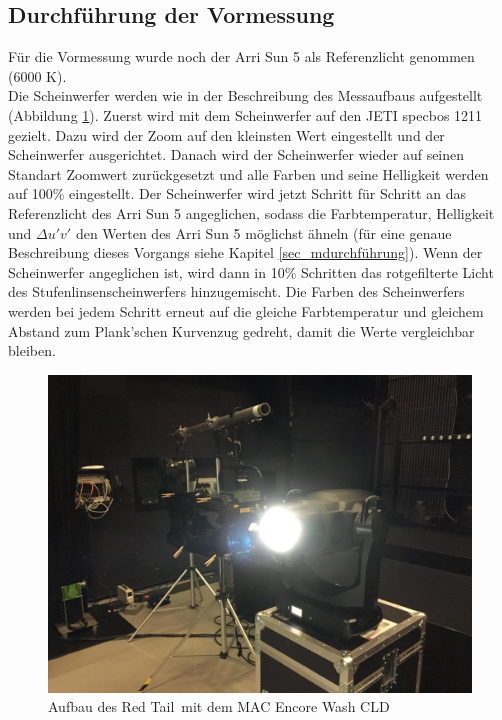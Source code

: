 \subsection{Durchführung der Vormessung}
Für die Vormessung wurde noch der Arri Sun 5 als Referenzlicht genommen (6000 K).\\
Die Scheinwerfer werden wie in der Beschreibung des Messaufbaus aufgestellt (Abbildung \ref{b_messbild1}).
Zuerst wird mit dem Scheinwerfer auf den JETI specbos 1211 gezielt. Dazu wird der Zoom auf den kleinsten Wert eingestellt und der Scheinwerfer ausgerichtet. Danach wird der Scheinwerfer wieder auf seinen Standart Zoomwert zurückgesetzt und alle Farben und seine Helligkeit werden auf 100\% eingestellt. Der Scheinwerfer wird jetzt Schritt für Schritt an das Referenzlicht des Arri Sun 5 angeglichen, sodass die Farbtemperatur, Helligkeit und $\Delta u'v'$ den Werten des Arri Sun 5 möglichst ähneln (für eine genaue Beschreibung dieses Vorgangs siehe Kapitel \ref{sec_mdurchführung}). Wenn der Scheinwerfer angeglichen ist, wird dann in 10\% Schritten das rotgefilterte Licht des Stufenlinsenscheinwerfers hinzugemischt. Die Farben des Scheinwerfers werden bei jedem Schritt erneut auf die gleiche Farbtemperatur und gleichem Abstand zum Plank'schen Kurvenzug gedreht, damit die Werte vergleichbar bleiben.

\begin{figure}[H]     %
\centering
\includegraphics[width=1.0\textwidth]{bilder/messbild1} 
\caption {Aufbau des \glqq Red Tail\grqq\ mit dem MAC Encore Wash CLD}\label{b_messbild1}
\end{figure}

